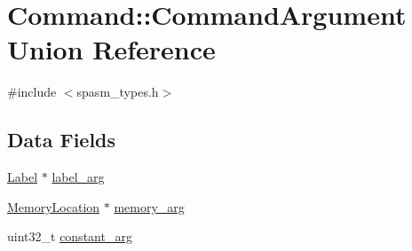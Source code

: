 \hypertarget{union_command_1_1_command_argument}{
\section{\-Command\-:\-:\-Command\-Argument \-Union \-Reference}
\label{union_command_1_1_command_argument}
}


{\ttfamily \#include $<$spasm\-\_\-types.\-h$>$}

\subsection*{\-Data \-Fields}
\begin{DoxyCompactItemize}
\item 
\hyperlink{struct_label}{\-Label} $\ast$ \hyperlink{union_command_1_1_command_argument_ad35f7f6890ba7afda2f6df885c80ee1b}{label\-\_\-arg}
\item 
\hyperlink{struct_memory_location}{\-Memory\-Location} $\ast$ \hyperlink{union_command_1_1_command_argument_aa1d92797db179e44197eb21140e4d207}{memory\-\_\-arg}
\item 
uint32\-\_\-t \hyperlink{union_command_1_1_command_argument_abac24a4437e622f24b8667b66db36839}{constant\-\_\-arg}
\end{DoxyCompactItemize}


